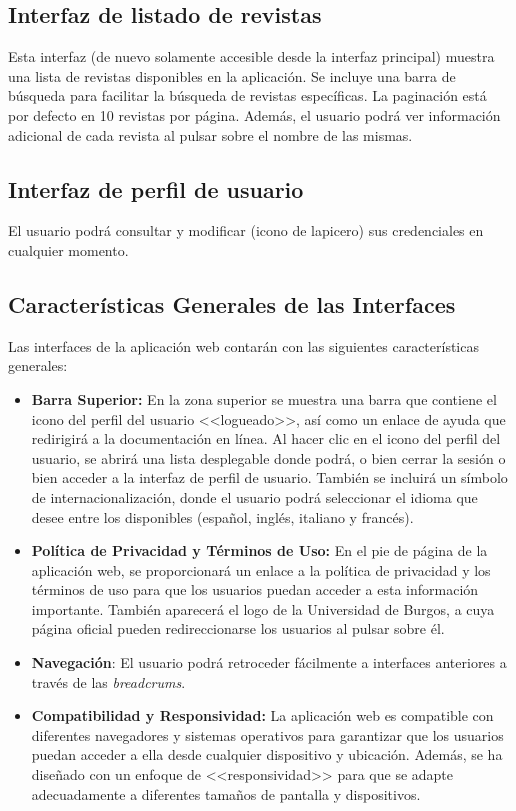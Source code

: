 \subsection{Interfaz de listado de revistas}
Esta interfaz (de nuevo solamente accesible desde la interfaz principal) muestra una lista de revistas disponibles en la aplicación. Se incluye una barra de búsqueda para facilitar la búsqueda de revistas específicas. La paginación está por defecto en 10 revistas por página. Además, el usuario podrá ver información adicional de cada revista al pulsar sobre el nombre de las mismas.

\subsection{Interfaz de perfil de usuario}
El usuario podrá consultar y modificar (icono de lapicero) sus credenciales en cualquier momento.


\subsection{Características Generales de las Interfaces}
Las interfaces de la aplicación web contarán con las siguientes características generales:

\begin{itemize} 
\item \textbf{Barra Superior:} En la zona superior se muestra una barra que contiene el icono del perfil del usuario <<logueado>>, así como un enlace de ayuda que redirigirá a la documentación en línea. Al hacer clic en el icono del perfil del usuario, se abrirá una lista desplegable donde podrá, o bien cerrar la sesión o bien acceder a la interfaz de perfil de usuario. También se incluirá un símbolo de internacionalización, donde el usuario podrá seleccionar el idioma que desee entre los disponibles (español, inglés, italiano y francés).
\item \textbf{Política de Privacidad y Términos de Uso:} En el pie de página de la aplicación web, se proporcionará un enlace a la política de privacidad y los términos de uso para que los usuarios puedan acceder a esta información importante. También aparecerá el logo de la Universidad de Burgos, a cuya página oficial pueden redireccionarse los usuarios al pulsar sobre él.
\item \textbf{Navegación}: El usuario podrá retroceder fácilmente a interfaces anteriores a través de las \textit{breadcrums}.
\item \textbf{Compatibilidad y Responsividad:} La aplicación web es compatible con diferentes navegadores y sistemas operativos para garantizar que los usuarios puedan acceder a ella desde cualquier dispositivo y ubicación. Además, se ha diseñado con un enfoque de <<responsividad>> para que se adapte adecuadamente a diferentes tamaños de pantalla y dispositivos.
\end{itemize}


